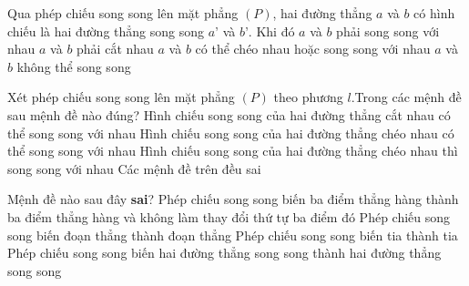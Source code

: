 \begin{ex}%
	Qua phép chiếu  song song lên mặt phẳng $(P)$, hai đường thẳng $a$ và $b$ có hình chiếu là hai đường thẳng song song $a’$ và $b’$. Khi đó
	 \choice
		{$a$ và $b$ phải song  song với nhau}
		 {$a$ và $b$ phải cắt nhau}
		{\True $a$ và $b$ có thể chéo nhau hoặc song song  với nhau}
		{$a$ và $b$ không thể song song} 
\end{ex}

\begin{ex}%
	Xét phép chiếu song song lên mặt phẳng  $(P)$ theo phương $l$.Trong các mệnh đề sau mệnh đề nào đúng?
	\choice 
		{Hình chiếu song song của hai đường thẳng cắt nhau có thể song song  với nhau}
		{\True Hình chiếu song song của hai đường thẳng chéo  nhau có thể song song với nhau}
		{Hình chiếu  song song của hai đường thẳng chéo nhau thì song song với nhau}
		{Các mệnh  đề trên đều sai}
\end{ex}

\begin{ex}%
	Mệnh đề nào sau đây  {\bf sai}?
	 \choice
		{Phép chiếu song song biến ba điểm thẳng hàng thành ba điểm  thẳng hàng và không làm thay đổi thứ tự ba điểm đó}
		{Phép chiếu song  song biến đoạn thẳng thành đoạn thẳng}
		 {Phép chiếu song song biến tia thành tia}
		{\True Phép chiếu song song biến hai đường thẳng song  song thành hai đường thẳng song song}
\end{ex}

